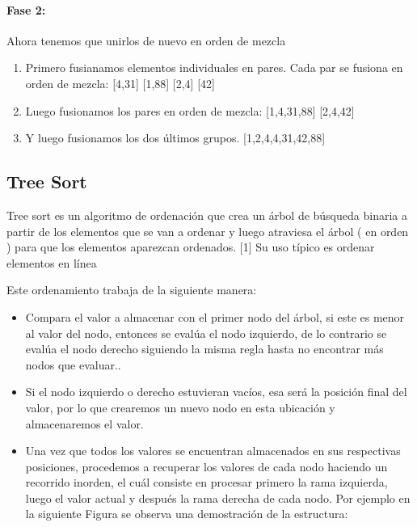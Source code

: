 \documentclass{article}
\begin{document}
    \paragraph{Fase 2:} Ahora tenemos que unirlos de nuevo en orden de mezcla
\begin{enumerate}
    \item Primero fusianamos elementos individuales en pares. Cada par se fusiona en orden de mezcla: [4,31] [1,88] [2,4] [42]
    \item Luego fusionamos los pares en orden de mezcla: [1,4,31,88] [2,4,42]
    \item Y luego fusionamos los dos últimos grupos. [1,2,4,4,31,42,88]
\end{enumerate}    
    
    \subsection{Tree Sort}
    
     Tree sort es un algoritmo de ordenación que crea un árbol de búsqueda binaria a partir de los elementos que se van a ordenar y luego atraviesa el árbol ( en orden ) para que los elementos aparezcan ordenados. [1] Su uso típico es ordenar elementos en línea 
     
     Este ordenamiento trabaja de la siguiente manera:
     \begin{itemize}
            \item Compara el valor a almacenar con el primer nodo del árbol, si este es menor al valor del nodo, entonces se evalúa el nodo izquierdo, de lo contrario se evalúa el nodo derecho siguiendo la misma regla hasta no encontrar más nodos que evaluar..

            \item Si el nodo izquierdo o derecho estuvieran vacíos, esa será la posición final del valor, por lo que crearemos un nuevo nodo en esta ubicación y almacenaremos el valor.
            
            \item Una vez que todos los valores se encuentran almacenados en sus respectivas posiciones, procedemos a recuperar los valores de cada nodo haciendo un recorrido inorden, el cuál consiste en procesar primero la rama izquierda, luego el valor actual y después la rama derecha de cada nodo.
    Por ejemplo en la siguiente Figura se observa una demostración de la estructura:
        
        \end{itemize}
        
\end{document}
